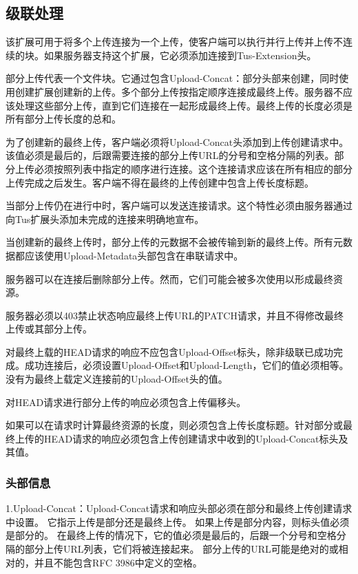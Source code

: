 \documentclass[bachelor]{thesis-uestc}
\begin{document}
\subsection{级联处理}
该扩展可用于将多个上传连接为一个上传，使客户端可以执行并行上传并上传不连续的块。如果服务器支持这个扩展，它必须添加连接到Tus-Extension头。
\par 部分上传代表一个文件块。它通过包含Upload-Concat：部分头部来创建，同时使用创建扩展创建新的上传。多个部分上传按指定顺序连接成最终上传。服务器不应该处理这些部分上传，直到它们连接在一起形成最终上传。最终上传的长度必须是所有部分上传长度的总和。
\par 为了创建新的最终上传，客户端必须将Upload-Concat头添加到上传创建请求中。该值必须是最后的，后跟需要连接的部分上传URL的分号和空格分隔的列表。部分上传必须按照列表中指定的顺序进行连接。这个连接请求应该在所有相应的部分上传完成之后发生。客户端不得在最终的上传创建中包含上传长度标题。
\par 当部分上传仍在进行中时，客户端可以发送连接请求。这个特性必须由服务器通过向Tus扩展头添加未完成的连接来明确地宣布。
\par 当创建新的最终上传时，部分上传的元数据不会被传输到新的最终上传。所有元数据都应该使用Upload-Metadata头部包含在串联请求中。
\par 服务器可以在连接后删除部分上传。然而，它们可能会被多次使用以形成最终资源。
\par 服务器必须以403禁止状态响应最终上传URL的PATCH请求，并且不得修改最终上传或其部分上传。
\par 对最终上载的HEAD请求的响应不应包含Upload-Offset标头，除非级联已成功完成。成功连接后，必须设置Upload-Offset和Upload-Length，它们的值必须相等。没有为最终上载定义连接前的Upload-Offset头的值。
\par 对HEAD请求进行部分上传的响应必须包含上传偏移头。
\par 如果可以在请求时计算最终资源的长度，则必须包含上传长度标题。针对部分或最终上传的HEAD请求的响应必须包含上传创建请求中收到的Upload-Concat标头及其值。
\subsubsection{头部信息}
1.Upload-Concat：Upload-Concat请求和响应头部必须在部分和最终上传创建请求中设置。 它指示上传是部分还是最终上传。 如果上传是部分内容，则标头值必须是部分的。 在最终上传的情况下，它的值必须是最后的，后跟一个分号和空格分隔的部分上传URL列表，它们将被连接起来。 部分上传的URL可能是绝对的或相对的，并且不能包含RFC 3986中定义的空格。
\end{document}
